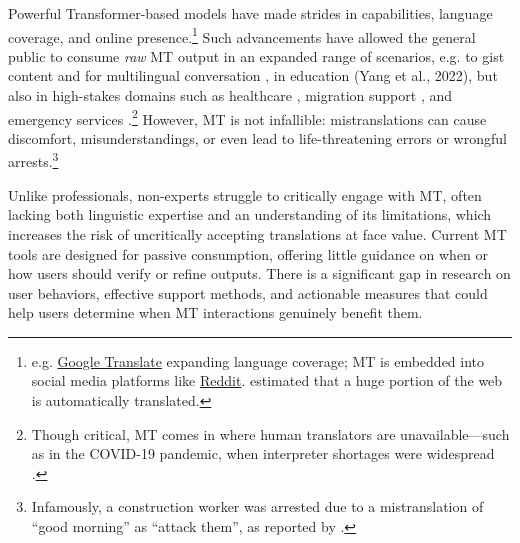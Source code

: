Powerful 
Transformer-based
models have made strides in capabilities, language coverage, and online presence.\footnote{e.g. \href{https://blog.google/products/translate/google-translate-new-languages-2024/}{Google Translate} expanding language coverage; MT is embedded into social media platforms like \href{https://slator.com/reddit-ceo-calls-machine-translation-big-unlock-for-growth/}{Reddit}.
\citet{thompson-etal-2024-shocking} estimated that a huge portion of the web is automatically translated.} 
Such advancements have allowed the general public to consume \textit{raw} MT output in an expanded range of scenarios, e.g.
to gist content and for multilingual conversation \citep{conversation, pombal2024context}, in education (Yang et al., 2022), but also in high-stakes domains such as 
 healthcare \citep{khoong2019assessing}, migration support \citep{liebling-etal-2022-opportunities}, and emergency services \citep{TURNER2015136}.\footnote{Though critical, MT comes in where human translators are unavailable---such as in the COVID-19 pandemic, when interpreter shortages were widespread \citep{khoong2022research, anastasopoulos2020tico}.}
 However, MT  is not infallible: mistranslations can cause discomfort, misunderstandings, or even lead to life-threatening errors \citep{taira2021pragmatic} or wrongful arrests.\footnote{Infamously, a construction worker was arrested due to a mistranslation of ``good morning'' as ``attack them'', as reported by \citet{guardian2017facebook}.}
 
 \bs{[following passage to better integrate}
 Unlike professionals, non-experts struggle to critically engage with MT, often lacking both linguistic expertise and an understanding of its limitations, which increases the risk of uncritically accepting translations at face value. Current MT tools are designed for passive consumption, offering little guidance on when or how users should verify or refine outputs. There is a significant gap in research on user behaviors, effective support methods, and actionable measures that could help users determine when MT interactions genuinely benefit them.\bs{]} 
 
